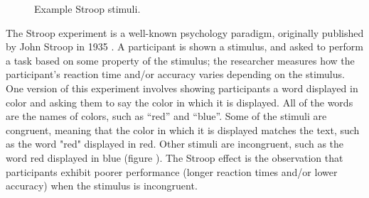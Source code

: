 \begin{figure}[t]%
    \centering
    \caption{Example Stroop stimuli.}%
    \label{fig:stroop_example}%
\end{figure}

The Stroop experiment is a well-known psychology paradigm, originally published by John Stroop in 1935 \cite{stroop1935studies}. A participant is shown a stimulus, and asked to perform a task based on some property of the stimulus; the researcher measures how the participant's reaction time and/or accuracy varies depending on the stimulus. One version of this experiment involves showing participants a word displayed in color and asking them to say the color in which it is displayed. All of the words are the names of colors, such as ``red'' and ``blue''. Some of the stimuli are congruent, meaning that the color in which it is displayed matches the text, such as the word "red" displayed in red. Other stimuli are incongruent, such as the word red displayed in blue (figure ). The Stroop effect is the observation that participants exhibit poorer performance (longer reaction times and/or lower accuracy) when the stimulus is incongruent.

